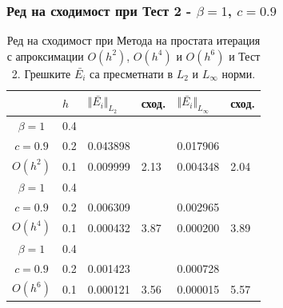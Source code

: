 \documentclass{beamer}
\begin{document}
\begin{frame}
\frametitle{Ред на сходимост при Тест 2 - $\beta = 1$, $c=0.9$}

\begin{table}[ht]
\centering
		\begin{tabular}{||c|l|ll|ll||}
			\hline
			\hline
             & $h$  &  	$\Vert \bar{ E_i} \Vert_{L_2}$ 	& сход.	& $\Vert \bar{ E_i}\Vert_{L_\infty}$  		&сход.   \\
   					\hline 					
			\hline 	
$\beta = 1$   	&0.4   &             &           &                & \\
     $c=0.9$     &0.2   &  0.043898  &             & 0.017906      &    \\
     $O(h^2)$	&0.1  & 0.009999 & 2.13       & 0.004348      & 2.04  \\
\hline 	
 $\beta = 1$   	&0.4  &            &               &               &     \\
     $c=0.9$  	&0.2   & 0.006309  &              & 0.002965      &        \\
     $O(h^4)$	&0.1  &  0.000432 &3.87        & 0.000200 &  3.89        \\
    \hline
 $\beta = 1$	&0.4   &             &        &               &        \\
   $ c=0.9$  	&0.2   &  0.001423  &        & 0.000728      &       \\
       $O(h^6)$	&0.1  &   0.000121 &3.56  & 0.000015 &   5.57       \\
	   \hline
			\hline 
		\end{tabular}
		\caption{Ред на сходимост при Метода на простата итерация с апроксимации $O(h^{2})$, $O(h^{4})$ и $O(h^{6})$ и Тест 2. Грешките $\bar{ E_i}$ са пресметнати в $L_2$ и $L_\infty$ норми.}
\label{tab:aB}
\end{table}

\end{frame}
\end{document}
